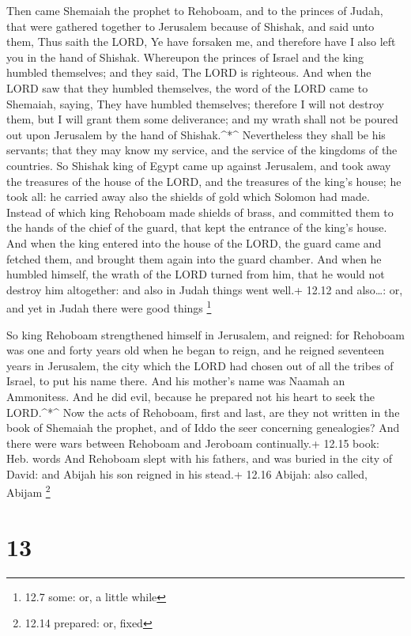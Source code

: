 Then came Shemaiah the prophet to Rehoboam, and to the
princes of Judah, that were gathered together to Jerusalem because of
Shishak, and said unto them, Thus saith the LORD, Ye have forsaken me,
and therefore have I also left you in the hand of Shishak. 
Whereupon the princes of Israel and the king humbled themselves; and
they said, The LORD is righteous.  And when the LORD saw
that they humbled themselves, the word of the LORD came to Shemaiah,
saying, They have humbled themselves; therefore I will not destroy them,
but I will grant them some deliverance; and my wrath shall not be poured
out upon Jerusalem by the hand of Shishak.\^{}*\^{} 
Nevertheless they shall be his servants; that they may know my service,
and the service of the kingdoms of the countries.  So
Shishak king of Egypt came up against Jerusalem, and took away the
treasures of the house of the LORD, and the treasures of the king's
house; he took all: he carried away also the shields of gold which
Solomon had made.  Instead of which king Rehoboam made
shields of brass, and committed them to the hands of the chief of the
guard, that kept the entrance of the king's house.  And
when the king entered into the house of the LORD, the guard came and
fetched them, and brought them again into the guard chamber.
 And when he humbled himself, the wrath of the LORD turned
from him, that he would not destroy him altogether: and also in Judah
things went well.+ 12.12 and also\ldots: or, and yet in Judah there were
good things \footnote{12.7 some: or, a little while}

 So king Rehoboam strengthened himself in Jerusalem, and
reigned: for Rehoboam was one and forty years old when he began to
reign, and he reigned seventeen years in Jerusalem, the city which the
LORD had chosen out of all the tribes of Israel, to put his name there.
And his mother's name was Naamah an Ammonitess.  And he did
evil, because he prepared not his heart to seek the LORD.\^{}*\^{}
 Now the acts of Rehoboam, first and last, are they not
written in the book of Shemaiah the prophet, and of Iddo the seer
concerning genealogies? And there were wars between Rehoboam and
Jeroboam continually.+ 12.15 book: Heb. words  And Rehoboam
slept with his fathers, and was buried in the city of David: and Abijah
his son reigned in his stead.+ 12.16 Abijah: also called, Abijam
\footnote{12.14 prepared: or, fixed}

\hypertarget{section-12}{%
\section{13}\label{section-12}}

